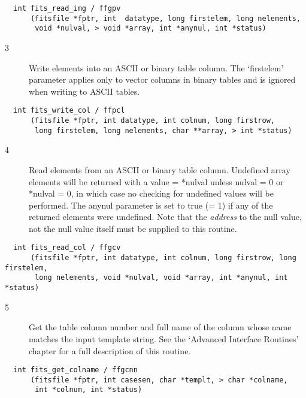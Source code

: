 \begin{verbatim}
  int fits_read_img / ffgpv
      (fitsfile *fptr, int  datatype, long firstelem, long nelements,
       void *nulval, > void *array, int *anynul, int *status)
\end{verbatim}

\begin{description}
\item[3 ] Write elements into an ASCII or binary table column.  The `firstelem'
    parameter applies only to vector columns in binary tables and is
   ignored when writing to ASCII tables.
\end{description}

\begin{verbatim}
  int fits_write_col / ffpcl
      (fitsfile *fptr, int datatype, int colnum, long firstrow,
       long firstelem, long nelements, char **array, > int *status)
\end{verbatim}

\begin{description}
\item[4 ] Read elements from an ASCII or binary table column.  Undefined
    array elements will be returned with a value = *nulval unless nulval = 0
    or *nulval = 0, in which case no checking for undefined values will be
    performed. The anynul parameter is set to true (= 1) if any of the returned
    elements were undefined.  Note that the {\em address} to the
   null value, not the null value itself must be supplied to this routine.
\end{description}

\begin{verbatim}
  int fits_read_col / ffgcv
      (fitsfile *fptr, int datatype, int colnum, long firstrow, long firstelem,
       long nelements, void *nulval, void *array, int *anynul, int *status)
\end{verbatim}

\begin{description}
\item[5 ] Get the table column number and full name of the column whose name
    matches the input template string.  See the `Advanced Interface Routines'
   chapter for a full description of this routine.
\end{description}

\begin{verbatim}
  int fits_get_colname / ffgcnn
      (fitsfile *fptr, int casesen, char *templt, > char *colname,
       int *colnum, int *status)
\end{verbatim}

